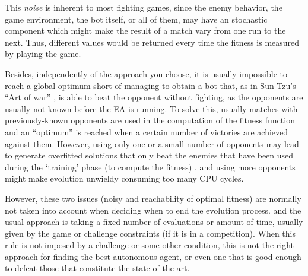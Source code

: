 \documentclass[runningheads,a4paper]{llncs}
\begin{document}
This \textit{noise} is inherent to most fighting games, since the enemy behavior, the game environment, the bot itself, or all of them, may have an
stochastic component which might make the result of a match vary from
one run to the next. Thus, different values would be returned
every time the fitness is measured by playing the game.

Besides, independently of the approach you choose, it is usually impossible to reach a global optimum short of managing to obtain a bot that, as in Sun Tzu's ``Art of war'' \cite{tzu2013art}, is able to beat the opponent without
fighting, as the opponents are usually not known before the EA is running. 
To solve this, usually matches with previously-known opponents are used in the
computation of the fitness function and an ``optimum'' is reached when a certain number of victories are achieved against them.
However, using only one or a small number of opponents may lead to
generate overfitted solutions that only beat the enemies that have
been used during the `training' phase (to compute the fitness)
\cite{DBLP:journals/jcst/MoraFGGF12}, and using more opponents might
make evolution unwieldy consuming too many CPU cycles. 

However, these two issues (noisy and reachability of optimal fitness)
are normally not taken into account when deciding when to end the
evolution process. and the usual approach is taking a
fixed number of evaluations or amount of time, usually given by the
game or challenge constraints (if it is in a competition). When this
rule is not imposed by a challenge or some other condition, this is
not the right approach for finding the best autonomous agent, or even
one that is 
good enough to defeat those that constitute the state of the art.
\end{document}

